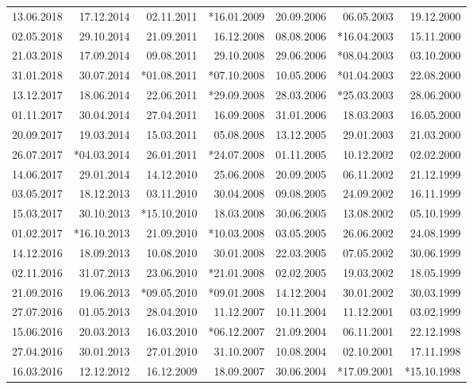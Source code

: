 \documentclass[11pt,a4paper,english,oneside]{book}
\numberwithin{equation}{chapter}
\begin{document}
\begin{table}[h]
\begin{tabular}{r r r r r r r }
						13.06.2018 & 17.12.2014 & 02.11.2011 & *16.01.2009 & 20.09.2006 & 06.05.2003 & 19.12.2000 \\
						02.05.2018 & 29.10.2014 & 21.09.2011 & 16.12.2008 & 08.08.2006 & *16.04.2003 & 15.11.2000 \\
						21.03.2018 & 17.09.2014 & 09.08.2011 & 29.10.2008 & 29.06.2006 & *08.04.2003 & 03.10.2000 \\
						31.01.2018 & 30.07.2014 & *01.08.2011 & *07.10.2008 & 10.05.2006 & *01.04.2003 & 22.08.2000 \\
						13.12.2017 & 18.06.2014 & 22.06.2011 & *29.09.2008 & 28.03.2006 & *25.03.2003 & 28.06.2000 \\
						01.11.2017 & 30.04.2014 & 27.04.2011 & 16.09.2008 & 31.01.2006 & 18.03.2003 & 16.05.2000 \\
						20.09.2017 & 19.03.2014 & 15.03.2011 & 05.08.2008 & 13.12.2005 & 29.01.2003 & 21.03.2000 \\
						26.07.2017 & *04.03.2014 & 26.01.2011 & *24.07.2008 & 01.11.2005 & 10.12.2002 & 02.02.2000 \\
						14.06.2017 & 29.01.2014 & 14.12.2010 & 25.06.2008 & 20.09.2005 & 06.11.2002 & 21.12.1999 \\
						03.05.2017 & 18.12.2013 & 03.11.2010 & 30.04.2008 & 09.08.2005 & 24.09.2002 & 16.11.1999 \\
						15.03.2017 & 30.10.2013 & *15.10.2010 & 18.03.2008 & 30.06.2005 & 13.08.2002 & 05.10.1999 \\
						01.02.2017 & *16.10.2013 & 21.09.2010 & *10.03.2008 & 03.05.2005 & 26.06.2002 & 24.08.1999 \\
						14.12.2016 & 18.09.2013 & 10.08.2010 & 30.01.2008 & 22.03.2005 & 07.05.2002 & 30.06.1999 \\
						02.11.2016 & 31.07.2013 & 23.06.2010 & *21.01.2008 & 02.02.2005 & 19.03.2002 & 18.05.1999 \\
						21.09.2016 & 19.06.2013 & *09.05.2010 & *09.01.2008 & 14.12.2004 & 30.01.2002 & 30.03.1999 \\
						27.07.2016 & 01.05.2013 & 28.04.2010 & 11.12.2007 & 10.11.2004 & 11.12.2001 & 03.02.1999 \\
						15.06.2016 & 20.03.2013 & 16.03.2010 & *06.12.2007 & 21.09.2004 & 06.11.2001 & 22.12.1998 \\
						27.04.2016 & 30.01.2013 & 27.01.2010 & 31.10.2007 & 10.08.2004 & 02.10.2001 & 17.11.1998 \\
						16.03.2016 & 12.12.2012 & 16.12.2009 & 18.09.2007 & 30.06.2004 & *17.09.2001 & *15.10.1998 \\

\end{tabular}
\end{table}
\end{document}
